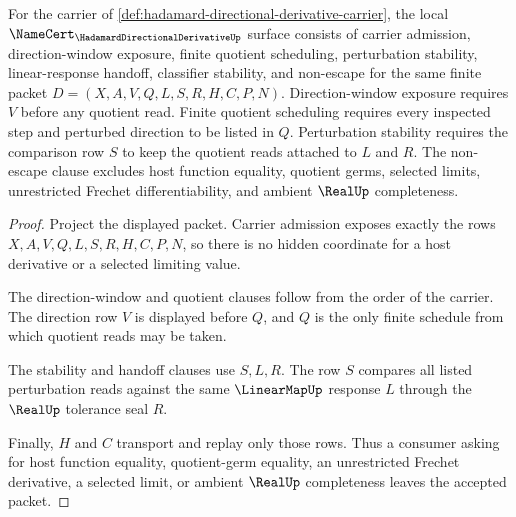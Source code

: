 \begin{theorem}
\label{thm:hadamard-directional-derivative-namecert-obligations}
For the carrier of \autoref{def:hadamard-directional-derivative-carrier}, the local $\NameCert_{\HadamardDirectionalDerivativeUp}$ surface consists of carrier admission, direction-window exposure, finite quotient scheduling, perturbation stability, linear-response handoff, classifier stability, and non-escape for the same finite packet $D=(X,A,V,Q,L,S,R,H,C,P,N)$. Direction-window exposure requires $V$ before any quotient read. Finite quotient scheduling requires every inspected step and perturbed direction to be listed in $Q$. Perturbation stability requires the comparison row $S$ to keep the quotient reads attached to $L$ and $R$. The non-escape clause excludes host function equality, quotient germs, selected limits, unrestricted Frechet differentiability, and ambient $\RealUp$ completeness.
\end{theorem}
\begin{proof}
Project the displayed packet. Carrier admission exposes exactly the rows $X,A,V,Q,L,S,R,H,C,P,N$, so there is no hidden coordinate for a host derivative or a selected limiting value.

The direction-window and quotient clauses follow from the order of the carrier. The direction row $V$ is displayed before $Q$, and $Q$ is the only finite schedule from which quotient reads may be taken.

The stability and handoff clauses use $S,L,R$. The row $S$ compares all listed perturbation reads against the same $\LinearMapUp$ response $L$ through the $\RealUp$ tolerance seal $R$.

Finally, $H$ and $C$ transport and replay only those rows. Thus a consumer asking for host function equality, quotient-germ equality, an unrestricted Frechet derivative, a selected limit, or ambient $\RealUp$ completeness leaves the accepted packet.
\end{proof}

